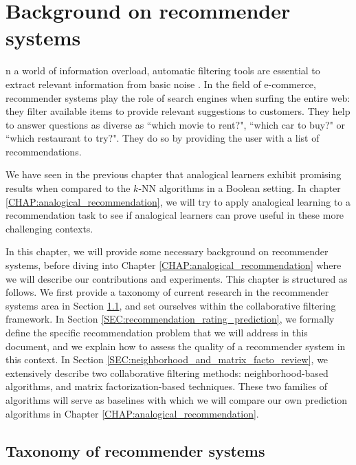 \chapter{Background on recommender systems}
\label{CHAP:background_reco_systems}
\localtableofcontents*
\vspace*{\baselineskip}

n a world of information overload, automatic filtering tools are
essential to extract relevant information from basic noise
\cite{RecoSystemHandbook,AdoTuzIEEE2005}. In the field of e-commerce,
recommender systems play the role of search engines when surfing the entire
web: they filter available items to provide relevant suggestions to customers.
They help to answer questions as diverse as ``which movie to rent?", ``which
car to buy?" or ``which restaurant to try?". They do so by providing the user
with a list of recommendations.

We have seen in the previous chapter that analogical learners exhibit promising
results when compared to the $k$-NN algorithms in a Boolean setting. In chapter
\ref{CHAP:analogical_recommendation}, we will try to apply analogical learning
to a recommendation task to see if analogical learners can prove useful in
these more challenging contexts.

In this chapter, we will provide some necessary background on recommender
systems, before diving into Chapter \ref{CHAP:analogical_recommendation} where
we will describe our contributions and experiments. This chapter is structured
as follows. We first provide a taxonomy
of current research in the recommender systems area in Section
\ref{SEC:taxonomy_rec_sys}, and set ourselves within the collaborative
filtering framework. In Section \ref{SEC:recommendation_rating_prediction}, we
formally define the specific recommendation problem that we will address in
this document, and we explain how to assess the quality of a recommender system
in this context. In Section \ref{SEC:neighborhood_and_matrix_facto_review}, we
extensively describe two collaborative filtering methods: neighborhood-based
algorithms, and matrix factorization-based techniques. These two families of
algorithms will serve as baselines with which we will compare our own prediction
algorithms in Chapter \ref{CHAP:analogical_recommendation}.

\section{Taxonomy of recommender systems}
\label{SEC:taxonomy_rec_sys}

